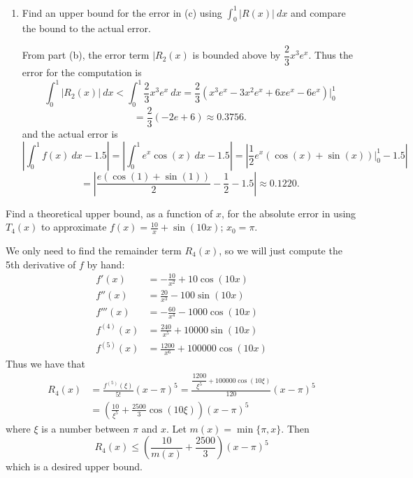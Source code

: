 \documentclass{article}
\theoremstyle{plain} %
\numberwithin{thm}{section} %
\theoremstyle{definition}
\begin{document}
\begin{question}{3}
\begin{enumerate}[label=(\alph*)]
            \item Find an upper bound for the error in (c) using \(\int _0^1 |R(x)|\ dx\) and compare the bound to the actual error.
            
            From part (b), the error term \(|R_2(x)\) is bounded above by \(\dfrac{2}{3}x^3 e^x\). Thus the error for the computation is
            \[
                \int _0^1 |R_2(x)|\ dx < \int _0^1 \dfrac{2}{3}x^3 e^x\ dx = \frac{2}{3}\left( x^3e^x - 3x^2e^x + 6xe^x - 6e^x \right) \Big|_0^1
            \]
            \[
                = \frac{2}{3}(-2e + 6) \approx 0.3756.
            \]
            and the actual error is
            \[
                \left\vert \int _0^1 f(x)\ dx - 1.5 \right\vert = \left\vert \int _0^1 e^x \cos (x)\ dx - 1.5 \right\vert = \left\vert \frac{1}{2}e^x(\cos (x) + \sin (x))\Big|_0^1 - 1.5 \right\vert
            \]
            \[
                = \left\vert \frac{e(\cos (1) + \sin (1))}{2} - \frac{1}{2} - 1.5 \right\vert \approx 0.1220.
            \]
        \end{enumerate}
    \end{question}
    \newpage
    \begin{question}{4}
        Find a theoretical upper bound, as a function of \(x\), for the absolute error in using \(T_4(x)\) to approximate \(f(x) = \frac{10}{x} + \sin(10x)\); \(x_0 = \pi\).

        \medskip
        
        We only need to find the remainder term \(R_4(x)\), so we will just compute the 5th derivative of \(f\) by hand:
        \begin{align*}
            f'(x) &= -\frac{10}{x^2} + 10\cos (10x) \\
            f''(x) &= \frac{20}{x^3} - 100\sin (10x) \\
            f'''(x) &= -\frac{60}{x^4} - 1000\cos (10x)\\
            f^{(4)}(x) &= \frac{240}{x^5} + 10000\sin (10x) \\
            f^{(5)}(x) &= \frac{1200}{x^6} + 100000\cos (10x)
        \end{align*}
        Thus we have that
        \begin{align*}
            R_4(x) &= \frac{f^{(5)}(\xi)}{5!}(x - \pi)^{5} = \frac{\dfrac{1200}{\xi^5} + 100000\cos (10\xi)}{120}(x - \pi)^5 \\
            &= \left( \frac{10}{\xi ^5} + \frac{2500}{3}\cos (10\xi)\right) (x - \pi)^5
        \end{align*}
        where \(\xi\) is a number between \(\pi\) and \(x\). Let \(m(x) = \min \{\pi , x\}\). Then
        \[
            R_4(x) \leq \left( \frac{10}{m(x)} + \frac{2500}{3}\right)(x - \pi)^5
        \]
        which is a desired upper bound.
    \end{question}
\end{document}
